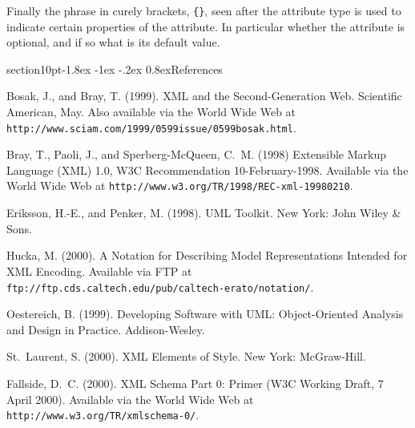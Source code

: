 \documentclass[10pt]{article}
\makeatletter
\renewcommand{\section}{\@startsection%
  {section}{1}{0pt}{-1.8ex \@plus -1ex \@minus -.2ex}%
  {0.8ex}{\normalfont\Large\bfseries}}
\newcommand{\url}[1]{\textup{\texttt{#1}}}
\newcommand{\notationdocloc}{\url{ftp://ftp.cds.caltech.edu/pub/caltech-erato/notation/}}
\makeatother
\begin{document}
Finally the phrase in curely brackets, {\tt \verb|{}|}, seen after
the attribute type is used to indicate certain properties of the
attribute. In particular whether the attribute is optional, and
if so what is its default value.



\setcounter{secnumdepth}{-1}
\section{References}

\setlength{\parskip}{1.2ex}

\begin{flushleft}

Bosak, J., and Bray, T. (1999).  {XML} and the Second-Generation Web.
Scientific American, May.  Also available via the World Wide Web at
\url{http://www.sciam.com/1999/0599issue/0599bosak.html}.

Bray, T., Paoli, J., and Sperberg-McQueen, C.~M. (1998) Extensible Markup
Language (XML) 1.0, W3C Recommendation 10-February-1998.  Available via the
World Wide Web at \url{http://www.w3.org/TR/1998/REC-xml-19980210}.

Eriksson, H.-E., and Penker, M. (1998).  UML Toolkit.  New York: John Wiley
\& Sons.

Hucka, M. (2000).  A Notation for Describing Model Representations Intended
for XML Encoding.  Available via FTP at \notationdocloc{}.

Oestereich, B.  (1999).  Developing Software with UML: Object-Oriented
Analysis and Design in Practice.  Addison-Wesley.

St.~Laurent, S. (2000).  XML Elements of Style.  New York: McGraw-Hill.

Fallside, D.~C.  (2000).  XML Schema Part 0: Primer (W3C Working Draft, 7
April 2000).  Available via the World Wide Web at
\url{http://www.w3.org/TR/xmlschema-0/}.

\end{flushleft}

\end{document}
